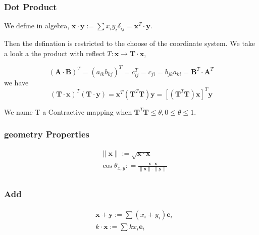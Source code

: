 \subsubsection{Dot Product}

We define in algebra, $ \boldsymbol{x} \cdot \boldsymbol{y} := \sum{x_iy_i \delta _{ij}} = \boldsymbol{x}^T \cdot \boldsymbol{y}$.

Then the defination is restricted to the choose of the coordinate system. We take a look a the product with reflect $T : \boldsymbol x \rightarrow  \boldsymbol{T} \cdot \boldsymbol{x}$,

\begin{equation}
    (\boldsymbol A \cdot \boldsymbol  B)^T = (a_{ik}b_{kj})^T = c_{ij}^T = c_{ji} = b_{jk}a_{ki} = \boldsymbol B^T \cdot \boldsymbol A^T
\end{equation}
we have 
\begin{equation}
    (\boldsymbol T \cdot \boldsymbol  x)^T(\boldsymbol T \cdot \boldsymbol  y) =  \boldsymbol x^T (\boldsymbol T^T \boldsymbol T) \boldsymbol y = [(\boldsymbol T^T \boldsymbol T) \boldsymbol x]^T \boldsymbol y
\end{equation}

We name T a Contractive mapping when $\boldsymbol T^T \boldsymbol T \leqslant   \theta, 0 \leqslant \theta \leqslant 1$.

\subsubsection{geometry Properties}

\begin{equation}
    \begin{split}
    &\parallel \boldsymbol{x} \parallel := \sqrt{\boldsymbol x \cdot \boldsymbol x}\\
    &\cos {\theta_{x,y}} : = \frac
    {\boldsymbol x \cdot \boldsymbol x}
    {\parallel \boldsymbol{x} \parallel \cdot \parallel \boldsymbol{y} \parallel}\\
\end{split}
\end{equation}

\subsubsection{Add}

\begin{equation}
    \begin{split}
    & \boldsymbol x + \boldsymbol y := \sum (x_i + y_i)\boldsymbol e_i\\
    & k \cdot \boldsymbol x := \sum kx_i\boldsymbol e_i\\
\end{split}
\end{equation}

